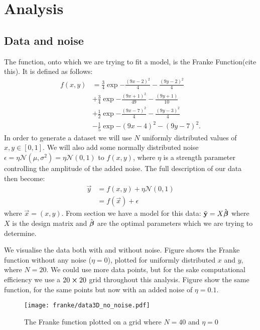 \section{Analysis}\label{sec:analysis}

    \subsection{Data and noise}\label{sec:data}
        The function, onto which we are trying to fit a model, is the Franke Function(cite this). It is defined as follows:
        \begin{align}\label{eq:francefunc}
            f(x,y) &= \frac{3}{4}\exp{-\frac{(9x-2)^2}{4}-\frac{(9y-2)^2}{4}} \nonumber\\
            &+ \frac{3}{4}\exp{-\frac{(9x+1)^2}{49}-\frac{(9y+1)}{10}} \nonumber\\
            &+ \frac{1}{2}\exp{-\frac{(9x-7)^2}{4}-\frac{(9y-3)^2}{4}} \nonumber\\
            &-\frac{1}{5}\exp{-(9x-4)^2-(9y-7)^2}.
        \end{align}
        In order to generate a dataset we will use $N$ uniformly distributed values of $x,y\in[0,1]$. We will also add some normally distributed noise $\epsilon = \eta\mathcal{N}(\mu,\sigma^2) = \eta\mathcal{N}(0,1)$ to $f(x,y)$, where $\eta$ is a strength parameter controlling the amplitude of the added noise. The full description of our data then become:
        \begin{align}\label{eq:datadescription}
            \vec{y} &= f(x,y) + \eta\mathcal{N}(0,1) \nonumber \\
            &= f(\vec{x}) + \epsilon
        \end{align}
        where $\vec{x} = (x,y)$. 
        From section  we have a model for this data: $\tilde{\mathbf{y}} = X\hat{\boldsymbol{\beta}}$ where $X$ is the design matrix and $\hat{\boldsymbol{\beta}}$ are the optimal parameters which we are trying to determine. 

        We visualise the data both with and without noise. Figure  shows the Franke function without any noise ($\eta=0$), plotted for uniformly distributed $x$ and $y$, where $N=20$. We could use more data points, but for the sake computational efficiency we use a $20\cross20$ grid throughout this analysis.  Figure  show the same function, for the same points but now with an added noise of $\eta=0.1$.

        \begin{figure}
            \texttt{[image: franke/data3D\_no\_noise.pdf]}
            \caption{The Franke function plotted on a grid where $N=40$ and $\eta=0$}
            \label{fig:franke_function}
        \end{figure}

